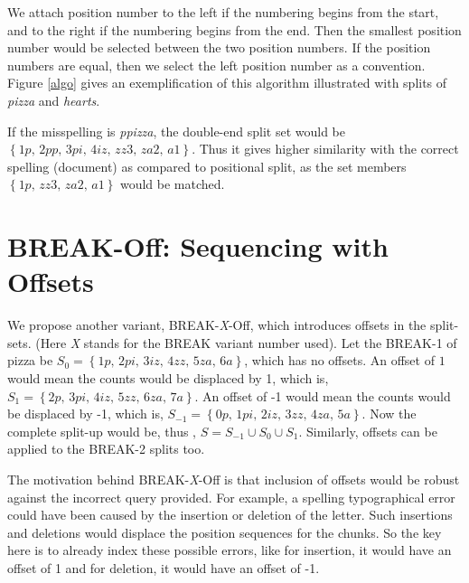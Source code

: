 We attach position number to the left if the numbering begins from the start, and to the right if the numbering begins from the end.
Then the smallest position number would be selected between the two position numbers.
If the position numbers are equal, then we select the left position number as a convention.
Figure \ref{algo} gives an exemplification of this algorithm illustrated with splits of \textit{pizza} and \textit{hearts}.

If the misspelling is \textit{ppizza}, the double-end split set would be $\left\lbrace \textit{1p, 2pp, 3pi, 4iz, zz3, za2, a1} \right\rbrace$. 
Thus it gives higher similarity with the correct spelling (document) as compared to positional split, as the set members $\left\lbrace \textit{1p, zz3, za2, a1} \right\rbrace$ would be matched.

\section{BREAK-Off: Sequencing with Offsets} 
We propose another variant, BREAK-\textit{X}-Off, which introduces offsets in the split-sets. 
(Here \textit{X} stands for the BREAK variant number used).
Let the BREAK-1 of pizza be $S_0 = \left\lbrace \textit{1p, 2pi, 3iz, 4zz, 5za, 6a} \right\rbrace$, which has no offsets.
An offset of $1$ would mean the counts would be displaced by 1, which is, $S_1 = \left\lbrace \textit{2p, 3pi, 4iz, 5zz, 6za, 7a} \right\rbrace$.
An offset of -1 would mean the counts would be displaced by -1, which is, $S_{-1} = \left\lbrace \textit{0p, 1pi, 2iz, 3zz, 4za, 5a} \right\rbrace$.
Now the complete split-up would be, thus , $S = S_{-1} \cup S_0 \cup S_1$. 
Similarly, offsets can be applied to the BREAK-2 splits too.

The motivation behind BREAK-\textit{X}-Off is that inclusion of offsets would be robust against the incorrect query provided.
For example, a spelling typographical error could have been caused by the insertion or deletion of the letter. 
Such insertions and deletions would displace the position sequences for the chunks. 
So the key here is to already index these possible errors, like for insertion, it would have an offset of 1 and for deletion, it would have an offset of -1.


